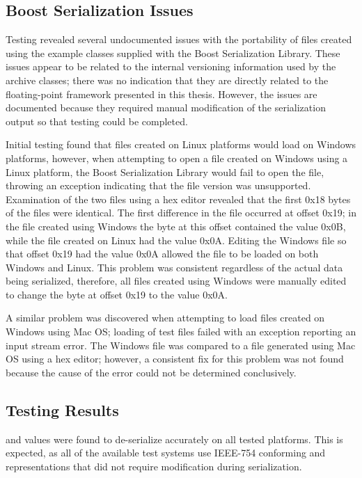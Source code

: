 \begin{singlespace}
  
\end{singlespace}

\subsection{Boost Serialization Issues}
Testing revealed several undocumented issues with the portability of files created using the example  classes supplied with the Boost Serialization Library. These issues appear to be related to the internal versioning information used by the archive classes; there was no indication that they are directly related to the floating-point framework presented in this thesis. However, the issues are documented because they required manual modification of the serialization output so that testing could be completed.

Initial testing found that files created on Linux platforms would load on Windows platforms, however, when attempting to open a file created on Windows using a Linux platform, the Boost Serialization Library would fail to open the file, throwing an exception indicating that the file version was unsupported. Examination of the two files using a hex editor revealed that the first 0x18 bytes of the files were identical. The first difference in the file occurred at offset 0x19; in the file created using Windows the byte at this offset contained the value 0x0B, while the file created on Linux had the value 0x0A. Editing the Windows file so that offset 0x19 had the value 0x0A allowed the file to be loaded on both Windows and Linux. This problem was consistent regardless of the actual data being serialized, therefore, all files created using Windows were manually edited to change the byte at offset 0x19 to the value 0x0A.

A similar problem was discovered when attempting to load files created on Windows using Mac OS; loading of test files failed with an exception reporting an input stream error. The Windows file was compared to a file generated using Mac OS using a hex editor; however, a consistent fix for this problem was not found because the cause of the error could not be determined conclusively.

\subsection{Testing Results}
 and  values were found to de-serialize accurately on all tested platforms. This is expected, as all of the available test systems use IEEE-754 conforming  and  representations that did not require modification during serialization.

